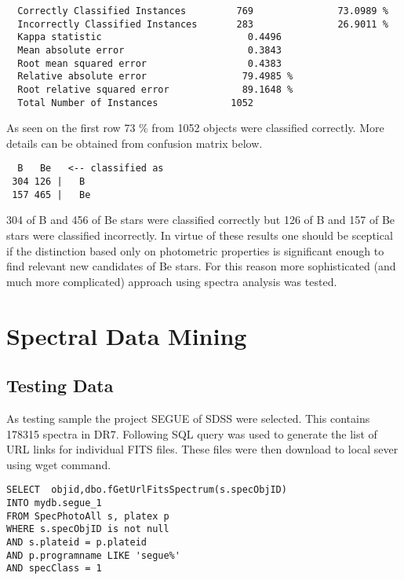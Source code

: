 \begin{lstlisting}
  Correctly Classified Instances         769               73.0989 %
  Incorrectly Classified Instances       283               26.9011 %
  Kappa statistic                          0.4496
  Mean absolute error                      0.3843
  Root mean squared error                  0.4383
  Relative absolute error                 79.4985 %
  Root relative squared error             89.1648 %
  Total Number of Instances             1052
\end{lstlisting}

As seen on the first row 73 \% from  1052 objects were classified
correctly. More details can be obtained from confusion matrix below.

\begin{lstlisting}
  B   Be   <-- classified as
 304 126 |   B
 157 465 |   Be
\end{lstlisting}

304 of B and 456 of Be stars were classified correctly but 126 of B
and 157 of Be stars were classified incorrectly. In virtue of these
results one should be sceptical if the distinction based only on
photometric properties is significant enough to find relevant new
candidates of Be stars. For this reason more sophisticated (and much
more complicated) approach using spectra analysis was tested.

\section{Spectral Data Mining}

\subsection{Testing Data}
As testing sample the project SEGUE of SDSS were selected. This
contains 178315 spectra in DR7. Following SQL query was used to
generate the list of URL links for individual FITS files. These files
were then download to local sever using wget command.

\begin{lstlisting}
SELECT  objid,dbo.fGetUrlFitsSpectrum(s.specObjID)                                                           
INTO mydb.segue_1                                                                                     
FROM SpecPhotoAll s, platex p                                                                         
WHERE s.specObjID is not null                                                                         
AND s.plateid = p.plateid                                                                             
AND p.programname LIKE 'segue%'                                                                       
AND specClass = 1
\end{lstlisting}

